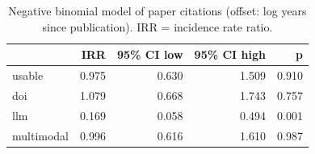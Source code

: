 \begin{table}
\caption{Negative binomial model of paper citations (offset: log years since publication). IRR = incidence rate ratio.}
\label{tab:citations}
\begin{tabular}{lrrrr}
\toprule
 & IRR & 95\% CI low & 95\% CI high & p \\
\midrule
usable & 0.975 & 0.630 & 1.509 & 0.910 \\
doi & 1.079 & 0.668 & 1.743 & 0.757 \\
llm & 0.169 & 0.058 & 0.494 & 0.001 \\
multimodal & 0.996 & 0.616 & 1.610 & 0.987 \\
\bottomrule
\end{tabular}
\end{table}
